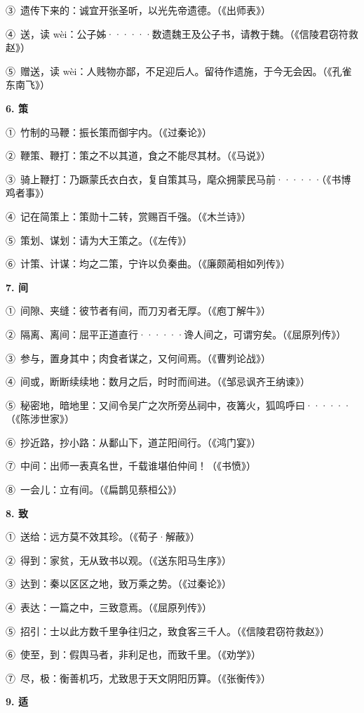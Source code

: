 ③\ 遗传下来的：诚宜开张圣听，以光先帝遗德。（《出师表》）

④\ 送，读 wèi：公子姊······数遗魏王及公子书，请教于魏。（《信陵君窃符救赵》）

⑤\ 赠送，读 wèi：人贱物亦鄙，不足迎后人。留待作遗施，于今无会因。（《孔雀东南飞》）

\textbf{6. 策}

①\ 竹制的马鞭：振长策而御宇内。（《过秦论》）

②\ 鞭策、鞭打：策之不以其道，食之不能尽其材。（《马说》）

③\ 骑上鞭打：乃蹶蒙氏衣白衣，复自策其马，麾众拥蒙民马前······（《书博鸡者事》）

④\ 记在简策上：策勋十二转，赏赐百千强。（《木兰诗》）

⑤\ 策划、谋划：请为大王策之。（《左传》）

⑥\ 计策、计谋：均之二策，宁许以负秦曲。（《廉颇蔺相如列传》）

\textbf{7. 间}

①\ 间隙、夹缝：彼节者有间，而刀刃者无厚。（《庖丁解牛》）

②\ 隔离、离间：屈平正道直行······谗人间之，可谓穷矣。（《屈原列传》）

③\ 参与，置身其中；肉食者谋之，又何间焉。（《曹刿论战》）

④\ 间或，断断续续地：数月之后，时时而间进。（《邹忌讽齐王纳谏》）

⑤\ 秘密地，暗地里：又间令吴广之次所旁丛祠中，夜篝火，狐鸣呼曰······（《陈涉世家》）

⑥\ 抄近路，抄小路：从鄱山下，道芷阳间行。（《鸿门宴》）

⑦\ 中间：出师一表真名世，千载谁堪伯仲间！（《书愤》）

⑧\ 一会儿：立有间。（《扁鹊见蔡桓公》）

\textbf{8. 致}

①\ 送给：远方莫不效其珍。（《荀子·解蔽》）

②\ 得到：家贫，无从致书以观。（《送东阳马生序》）

③\ 达到：秦以区区之地，致万乘之势。（《过秦论》）

④\ 表达：一篇之中，三致意焉。（《屈原列传》）

⑤\ 招引：士以此方数千里争往归之，致食客三千人。（《信陵君窃符救赵》）

⑥\ 使至，到：假舆马者，非利足也，而致千里。（《劝学》）

⑦\ 尽，极：衡善机巧，尤致思于天文阴阳历算。（《张衡传》）

\textbf{9. 适}

